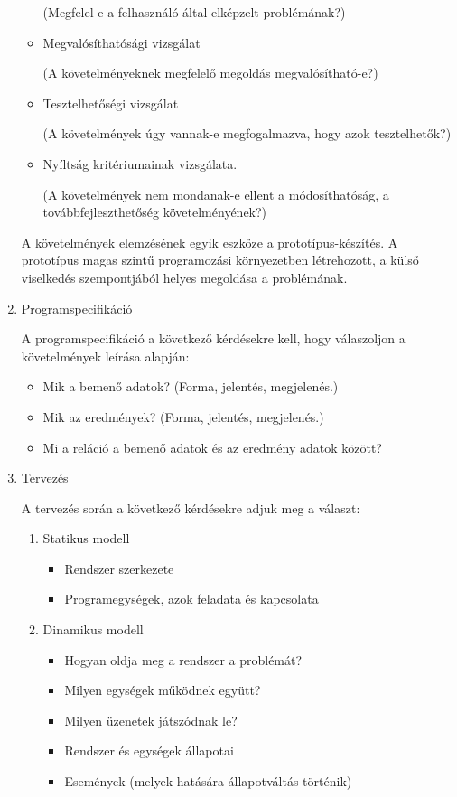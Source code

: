 \documentclass[margin=0px]{article}
\begin{document}
\begin{enumerate}
\begin{itemize}
						(Megfelel-e a felhasználó által elképzelt problémának?)
						
						\item Megvalósíthatósági vizsgálat
						
						(A követelményeknek megfelelő megoldás megvalósítható-e?)
						
						\item Tesztelhetőségi vizsgálat
						
						(A követelmények úgy vannak-e megfogalmazva, hogy azok tesztelhetők?)
						
						\item Nyíltság kritériumainak vizsgálata.
						
						(A követelmények nem mondanak-e ellent a módosíthatóság, a továbbfejleszthetőség
						követelményének?)
				\end{itemize}
				
				A követelmények elemzésének egyik eszköze a prototípus-készítés.
				A prototípus magas szintű programozási környezetben létrehozott, a
				külső viselkedés szempontjából helyes megoldása a problémának.
			\item Programspecifikáció
			
				A programspecifikáció a következő kérdésekre kell, hogy válaszoljon a
				követelmények leírása alapján:
				
				\begin{itemize}
					\item Mik a bemenő adatok? (Forma, jelentés, megjelenés.)
					\item Mik az eredmények? (Forma, jelentés, megjelenés.)
					\item Mi a reláció a bemenő adatok és az eredmény adatok között?
				\end{itemize}
			\item Tervezés
			
				A tervezés során a következő kérdésekre adjuk
				meg a választ:
				\begin{enumerate}
					\item Statikus modell
						\begin{itemize}
							\item Rendszer szerkezete
							\item Programegységek, azok feladata és kapcsolata
						\end{itemize}
					\item Dinamikus modell
					\begin{itemize}
						\item Hogyan oldja meg a rendszer a problémát?
						\item Milyen egységek működnek együtt?
						\item Milyen üzenetek játszódnak le?
						\item Rendszer és egységek állapotai
						\item Események (melyek hatására állapotváltás történik)
					\end{itemize}
					

\end{enumerate}
\end{enumerate}
\end{document}
